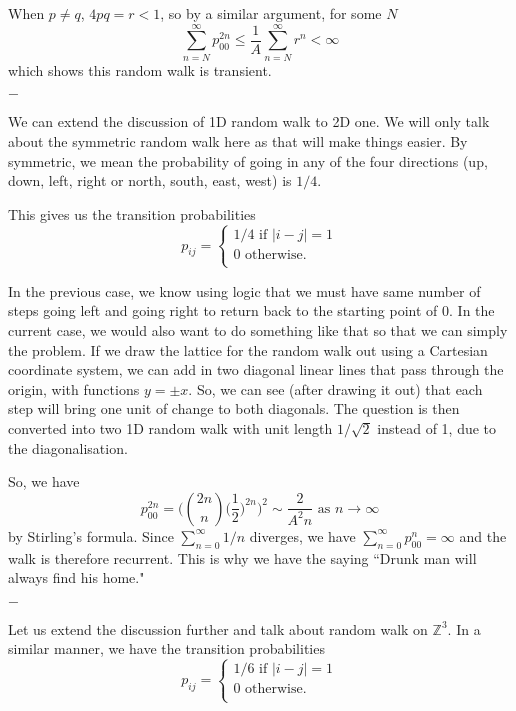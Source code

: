 \documentclass[11pt, a4paper, oneside]{book}
\theoremstyle{definition}
\def\Z{\mathbb{Z}}
\newcommand{\breaking}{%
    \begin{center}
    $-$
    \end{center}%
}
\begin{document}
\noindent When $p \neq q$, $4pq = r < 1$, so by a similar argument, for some $N$\[
\sum_{n=N}^{\infty} p_{00}^{2n} \le \frac{1}{A} \sum_{n=N}^{\infty} r^n < \infty
\]
which shows this random walk is transient. 

\breaking

\noindent We can extend the discussion of 1D random walk to 2D one. We will only talk about the symmetric random walk here as that will make things easier. By symmetric, we mean the probability of going in any of the four directions (up, down, left, right or north, south, east, west) is $1/4$. 

\noindent This gives us the transition probabilities 
\begin{equation*}
p_{ij} = 
\begin{cases}
	1/4 \text{ if } |i - j| = 1 \\ 
	0 \text{ otherwise}. \\
\end{cases} 
\end{equation*}

\noindent In the previous case, we know using logic that we must have same number of steps going left and going right to return back to the starting point of 0. In the current case, we would also want to do something like that so that we can simply the problem. If we draw the lattice for the random walk out using a Cartesian coordinate system, we can add in two diagonal linear lines that pass through the origin, with functions $y = \pm x$. So, we can see (after drawing it out) that each step will bring one unit of change to both diagonals. The question is then converted into two 1D random walk with unit length $1/\sqrt{2}$ instead of 1, due to the diagonalisation. 

\noindent So, we have\[
p_{00}^{2n} = \Big( \binom{2n}{n} \big( \frac{1}{2}\big)^{2n} \Big)^2 \sim \frac{2}{A^2 n} \text{ as } n \to \infty
\]
by Stirling's formula. Since $\sum_{n=0}^{\infty} 1/n$ diverges, we have $\sum_{n=0}^{\infty} p_{00}^n = \infty$ and the walk is therefore recurrent. This is why we have the saying ``Drunk man will always find his home."

\breaking

\noindent Let us extend the discussion further and talk about random walk on $\Z^3$. In a similar manner, we have the transition probabilities 
\begin{equation*}
p_{ij} = 
\begin{cases}
	1/6 \text{ if } |i - j| = 1 \\ 
	0 \text{ otherwise}. \\
\end{cases} 
\end{equation*}
\end{document}

